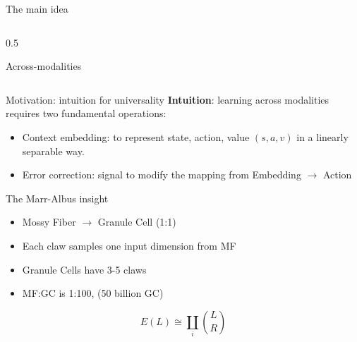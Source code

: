 \documentclass[aspectratio=169]{beamer}
\begin{document}
\begin{frame}{The main idea}
\begin{columns}
\begin{column}{0.5\textwidth}
\begin{block}{Across-modalities}
					
				\end{block}
			\end{column}
		\end{columns}
		
	\end{frame}
	
	\begin{frame}{Motivation: intuition for universality}
		\textbf{Intuition}: learning across modalities requires two fundamental operations:
		\begin{itemize}
			\item Context embedding: to represent state, action, value $(s, a, v)$ in a linearly separable way.
			\item Error correction: signal to modify the mapping from Embedding $\rightarrow$ Action
		\end{itemize}
		
		\begin{block}{The Marr-Albus insight \parencite{marrTheoryCerebellarCortex1969}}
			\begin{itemize}
				\item Mossy Fiber $\rightarrow$ Granule Cell (1:1)
				\item Each claw samples one input dimension from MF
				\item Granule Cells have 3-5 claws
				\item MF:GC is 1:100, (50 billion GC)
			\end{itemize}
			\[ E(L) \cong \coprod_{i} \binom{L}{R} \]
		\end{block}
		
	\end{frame}
	
\end{document}
